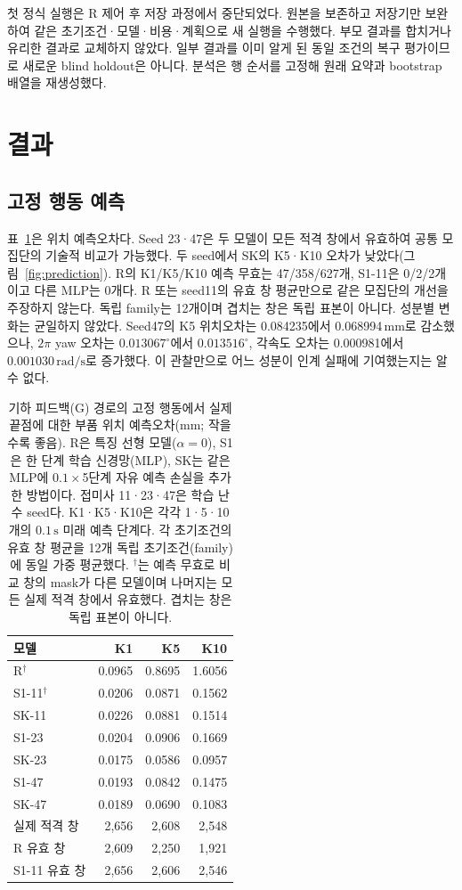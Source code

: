\documentclass[conference,a4paper]{IEEEtran}
\begin{document}
첫 정식 실행은 R 제어 후 저장 과정에서 중단되었다.
원본을 보존하고 저장기만 보완하여 같은 초기조건·모델·비용·계획으로 새 실행을 수행했다.
부모 결과를 합치거나 유리한 결과로 교체하지 않았다.
일부 결과를 이미 알게 된 동일 조건의 복구 평가이므로 새로운 blind holdout은 아니다.
분석은 행 순서를 고정해 원래 요약과 bootstrap 배열을 재생성했다.

\section{결과}\label{sec:results}
\subsection{고정 행동 예측}
표~\ref{tab:prediction}은 위치 예측오차다.
Seed 23·47은 두 모델이 모든 적격 창에서 유효하여 공통 모집단의 기술적 비교가 가능했다.
두 seed에서 SK의 K5·K10 오차가 낮았다(그림~\ref{fig:prediction}).
R의 K1/K5/K10 예측 무효는 47/358/627개, S1-11은 0/2/2개이고 다른 MLP는 0개다.
R 또는 seed11의 유효 창 평균만으로 같은 모집단의 개선을 주장하지 않는다.
독립 family는 12개이며 겹치는 창은 독립 표본이 아니다.
성분별 변화는 균일하지 않았다.
Seed47의 K5 위치오차는 0.084235에서 0.068994\,mm로 감소했으나,
$2\pi$ yaw 오차는 $0.013067^\circ$에서 $0.013516^\circ$,
각속도 오차는 0.000981에서 $0.001030\,\mathrm{rad/s}$로 증가했다.
이 관찰만으로 어느 성분이 인계 실패에 기여했는지는 알 수 없다.

\begin{table}[t]
\caption{기하 피드백(G) 경로의 고정 행동에서 실제 끝점에 대한 부품 위치 예측오차(mm; 작을수록 좋음).
R은 특징 선형 모델($\alpha=0$), S1은 한 단계 학습 신경망(MLP), SK는 같은 MLP에 $0.1\times$5단계 자유 예측 손실을 추가한 방법이다.
접미사 11·23·47은 학습 난수 seed다. K1·K5·K10은 각각 1·5·10개의 $0.1\,\mathrm s$ 미래 예측 단계다.
각 초기조건의 유효 창 평균을 12개 독립 초기조건(family)에 동일 가중 평균했다.
$^\dagger$는 예측 무효로 비교 창의 mask가 다른 모델이며 나머지는 모든 실제 적격 창에서 유효했다.
겹치는 창은 독립 표본이 아니다.}\label{tab:prediction}
\centering\small
\begin{tabular}{@{}lrrr@{}}
\toprule 모델 & K1 & K5 & K10\\ \midrule
R$^\dagger$ & 0.0965 & 0.8695 & 1.6056\\
S1-11$^\dagger$ & 0.0206 & 0.0871 & 0.1562\\
SK-11 & 0.0226 & 0.0881 & 0.1514\\
S1-23 & 0.0204 & 0.0906 & 0.1669\\
SK-23 & 0.0175 & 0.0586 & 0.0957\\
S1-47 & 0.0193 & 0.0842 & 0.1475\\
SK-47 & 0.0189 & 0.0690 & 0.1083\\ \midrule
실제 적격 창 & 2,656 & 2,608 & 2,548\\
R 유효 창 & 2,609 & 2,250 & 1,921\\
S1-11 유효 창 & 2,656 & 2,606 & 2,546\\
\bottomrule
\end{tabular}
\end{table}
\end{document}
